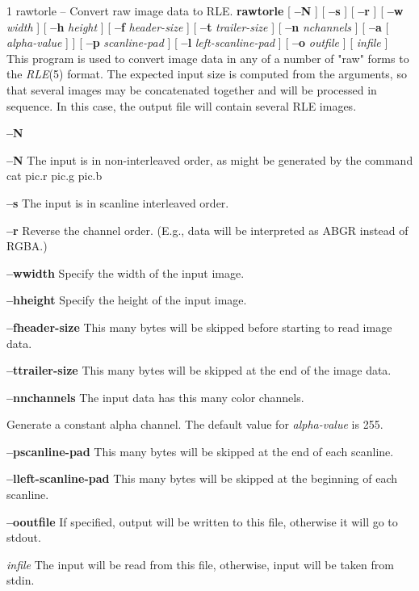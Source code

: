 %
%
%
 1
rawtorle -- Convert raw image data to RLE.
{\bf rawtorle}
[
{\bf --N}
] [
{\bf --s}
] [
{\bf --r}
] [
{\bf --w}
{\it width}
] [
{\bf --h}
{\it height}
] [
{\bf --f}
{\it header-size}
] [
{\bf --t}
{\it trailer-size}
] [
{\bf --n}
{\it nchannels}
] [
{\bf --a}
[
{\it alpha-value}
] ] [
{\bf --p}
{\it scanline-pad}
] [
{\bf --l}
{\it left-scanline-pad}
] [
{\bf --o}
{\it outfile}
] [
{\it infile}
] 
This program is used to convert image data in any of a number of "raw" forms to the
{\it RLE}{\rm (5)}
format.  The expected input size is computed from the arguments, so
that several images may be concatenated together and will be processed
in sequence.  In this case, the output file will contain several RLE images.
\begin{TPlist}{{\bf --N}}
\item[{{\bf --N}}]
The input is in non-interleaved order, as might be generated by the command
\nwl
cat pic.r pic.g pic.b
\item[{{\bf --s}}]
The input is in scanline interleaved order.
\item[{{\bf --r}}]
Reverse the channel order.  (E.g., data will be interpreted as ABGR
instead of RGBA.)
\item[{{\bf --w}{\it }{\bf width}
}]
Specify the width of the input image.
\item[{{\bf --h}{\it }{\bf height}
}]
Specify the height of the input image.
\item[{{\bf --f}{\it }{\bf header-size}
}]
This many bytes will be skipped before starting to read image data.
\item[{{\bf --t}{\it }{\bf trailer-size}
}]
This many bytes will be skipped at the end of the image data.
\item[{{\bf --n}{\it }{\bf nchannels}
}]
The input data has this many color channels.
\item[{%
\bf --a \rm%
[%
\it alpha-value\rm%
]}]
Generate a constant alpha channel.  The default value for
{\it alpha-value}
is 255.
\item[{{\bf --p}{\it }{\bf scanline-pad}
}]
This many bytes will be skipped at the end of each scanline.
\item[{{\bf --l}{\it }{\bf left-scanline-pad}
}]
This many bytes will be skipped at the beginning of each scanline.
\item[{{\bf --o}{\it }{\bf outfile}
}]
If specified, output will be written to this file, otherwise it will
go to stdout.
\item[{{\it infile}}]
The input will be read from this file, otherwise, input will
be taken from stdin.
\end{TPlist}\par\noindent
